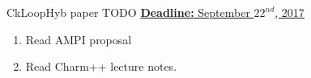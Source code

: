 
\begin{frame}{CkLoopHyb paper} {TODO} 
\underline{\textbf{Deadline:} September $22^{nd}$, 2017}
\begin{enumerate}
\ptask Add writeup for dot product results on Cori. 
\ptask Add projections results. 
\ptask Need a new application.
\ptask Update the paper technique to be consistent with experiments. 
\ptask Add PAPI cache misses for problem statement. 
\ptask Fix diagrams.
\ptask Add diagram for scheduling. 
\ptask Write proposal.
\item  Read AMPI proposal 
\item Read Charm++ lecture notes. 
\end{enumerate}

\end{frame} 


